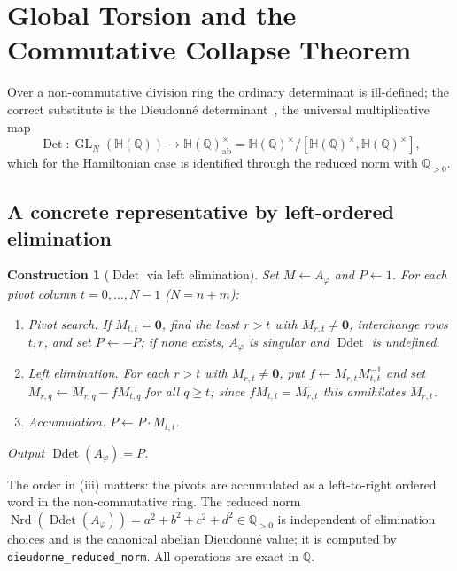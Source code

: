 \documentclass[pdflatex,sn-mathphys-num]{sn-jnl}
\theoremstyle{thmstyleone}%
\newtheorem{construction}[theorem]{Construction}%
\theoremstyle{thmstyletwo}%
\theoremstyle{thmstylethree}%
\newcommand{\HH}{\mathbb{H}}
\newcommand{\QQ}{\mathbb{Q}}
\newcommand{\Nrd}{\operatorname{Nrd}}
\newcommand{\Ddet}{\operatorname{Ddet}}
\newcommand{\Det}{\operatorname{Det}}
\newcommand{\Aphi}{A_{\varphi}}
\DeclareMathOperator{\GL}{GL}
\begin{document}
\section{Global Torsion and the Commutative Collapse Theorem}
\label{sec:collapse}

Over a non-commutative division ring the ordinary determinant is
ill-defined; the correct substitute is the Dieudonn\'e
determinant~\cite{Dieudonne}, the universal multiplicative map
\[
  \Det:\GL_N(\HH(\QQ))\longrightarrow
       \HH(\QQ)^{\times}_{\mathrm{ab}}
       =\HH(\QQ)^{\times}\big/[\HH(\QQ)^{\times},\HH(\QQ)^{\times}],
\]
which for the Hamiltonian case is identified through the reduced norm with
$\QQ_{>0}$.

\subsection{A concrete representative by left-ordered elimination}

\begin{construction}[$\Ddet$ via left elimination]\label{con:ddet}
Set $M\gets\Aphi$ and $P\gets1$. For each pivot column $t=0,\dots,N-1$
($N=n+m$):
\begin{enumerate}[label=\textup{(\roman*)}]
\item \emph{Pivot search.} If $M_{t,t}=\mathbf0$, find the least $r>t$ with
$M_{r,t}\neq\mathbf0$, interchange rows $t,r$, and set $P\gets-P$; if none
exists, $\Aphi$ is singular and $\Ddet$ is undefined.
\item \emph{Left elimination.} For each $r>t$ with $M_{r,t}\neq\mathbf0$,
put $f\gets M_{r,t}M_{t,t}^{-1}$ and set
$M_{r,q}\gets M_{r,q}-fM_{t,q}$ for all $q\ge t$; since $fM_{t,t}=M_{r,t}$
this annihilates $M_{r,t}$.
\item \emph{Accumulation.} $P\gets P\cdot M_{t,t}$.
\end{enumerate}
Output $\Ddet(\Aphi)=P$.
\end{construction}

The order in (iii) matters: the pivots are accumulated as a left-to-right
ordered word in the non-commutative ring. The reduced norm
$\Nrd(\Ddet(\Aphi))=a^2+b^2+c^2+d^2\in\QQ_{>0}$ is independent of
elimination choices and is the canonical abelian Dieudonn\'e value; it is
computed by \texttt{dieudonne\_reduced\_norm}. All operations are exact in
$\QQ$.
\end{document}
